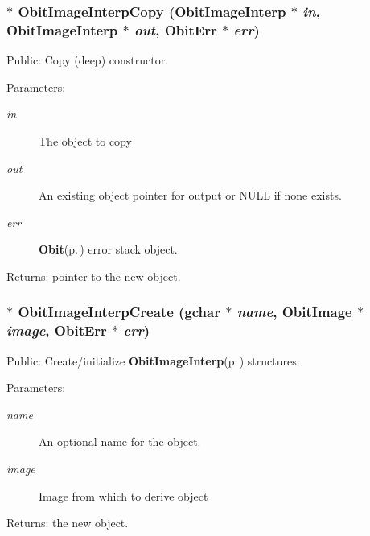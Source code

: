 \subsubsection{$\ast$ Obit\-Image\-Interp\-Copy ({\bf Obit\-Image\-Interp} $\ast$ {\em in}, {\bf Obit\-Image\-Interp} $\ast$ {\em out}, {\bf Obit\-Err} $\ast$ {\em err})}\label{ObitImageInterp_8h_a11}


Public: Copy (deep) constructor. 

\begin{Desc}
\item[Parameters:]
\begin{description}
\item[{\em in}]The object to copy \item[{\em out}]An existing object pointer for output or NULL if none exists. \item[{\em err}]{\bf Obit}{\rm (p.\,\pageref{structObit})} error stack object. \end{description}
\end{Desc}
\begin{Desc}
\item[Returns:]pointer to the new object. \end{Desc}
\subsubsection{$\ast$ Obit\-Image\-Interp\-Create (gchar $\ast$ {\em name}, {\bf Obit\-Image} $\ast$ {\em image}, {\bf Obit\-Err} $\ast$ {\em err})}\label{ObitImageInterp_8h_a13}


Public: Create/initialize {\bf Obit\-Image\-Interp}{\rm (p.\,\pageref{structObitImageInterp})} structures. 

\begin{Desc}
\item[Parameters:]
\begin{description}
\item[{\em name}]An optional name for the object. \item[{\em image}]Image from which to derive object \end{description}
\end{Desc}
\begin{Desc}
\item[Returns:]the new object. \end{Desc}
